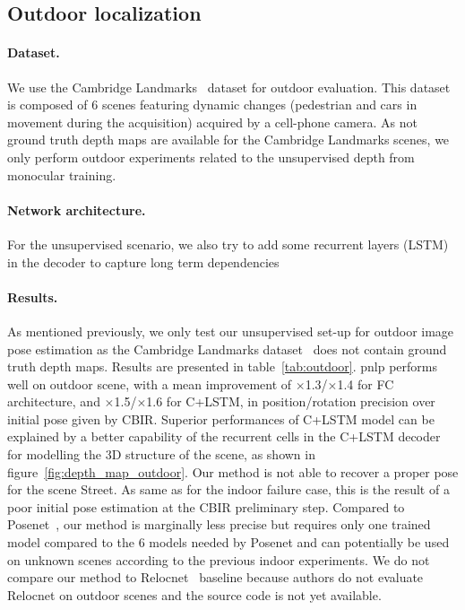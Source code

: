 \subsection{Outdoor localization}
\paragraph{Dataset.} We use the Cambridge Landmarks~\citep{Kendall2015} dataset for outdoor evaluation. This dataset is composed of 6 scenes featuring dynamic changes (pedestrian and cars in movement during the acquisition) acquired by a cell-phone camera. As not ground truth depth maps are available for the Cambridge Landmarks scenes, we only perform outdoor experiments related to the unsupervised depth from monocular training.

\paragraph{Network architecture.} For the unsupervised scenario, we also try to add some recurrent layers (LSTM) in the decoder to capture long term dependencies~\citep{Visin2015, Li2016b}

\paragraph{Results.}


As mentioned previously, we only test our unsupervised set-up for outdoor image pose estimation as the Cambridge Landmarks dataset~\citep{Kendall2015} does not contain ground truth depth maps. Results are presented in table~\ref{tab:outdoor}. \ac{pnlp} performs well on outdoor scene, with a mean improvement of $\times$1.3/$\times$1.4 for FC architecture, and $\times$1.5/$\times$1.6 for C+LSTM, in position/rotation precision over initial pose given by CBIR. Superior performances of C+LSTM model can be explained by a better capability of the recurrent cells in the C+LSTM decoder for modelling the 3D structure of the scene, as shown in figure~\ref{fig:depth_map_outdoor}. Our method is not able to recover a proper pose for the scene Street. As same as for the indoor failure case, this is the result of a poor initial pose estimation at the CBIR preliminary step. Compared to Posenet~\citep{Kendall2017}, our method is marginally less precise but requires only one trained model compared to the 6 models needed by Posenet and can potentially be used on unknown scenes according to the previous indoor experiments. We do not compare our method to Relocnet~\citep{Purkait2018} baseline because authors do not evaluate Relocnet on outdoor scenes and the source code is not yet available.

